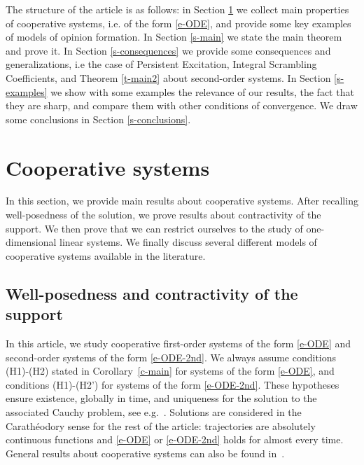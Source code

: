 \documentclass[journal]{article}
\begin{document}
The structure of the article is as follows: in Section \ref{s-cooperative} we collect main properties of cooperative systems, i.e. of the form \eqref{e-ODE}, and provide some key examples of models of opinion formation. In Section \ref{s-main} we state the main theorem and prove it. In Section \ref{s-consequences} we provide some consequences and generalizations, i.e the case of Persistent Excitation, Integral Scrambling Coefficients, and Theorem \ref{t-main2} about second-order systems. In  Section \ref{s-examples} we show with some examples the relevance of our results, the fact that they are sharp, and compare them with other conditions of convergence. We draw some conclusions in Section \ref{s-conclusions}.

\section{Cooperative systems}
\label{s-cooperative}

In this section, we provide main results about cooperative systems. After recalling well-posedness of the solution, we  prove results about contractivity of the support. We then prove that we can restrict ourselves to the study of one-dimensional linear systems. We finally discuss several different models of cooperative systems available in the literature.

\subsection{Well-posedness and contractivity of the support} \label{s-contractive}

In this article, we study cooperative first-order systems of the form \eqref{e-ODE} and second-order systems of the form \eqref{e-ODE-2nd}. We always assume conditions (H1)-(H2) stated in Corollary~\ref{c-main} for systems of the form \eqref{e-ODE},
and conditions (H1)-(H2') for systems of the form \eqref{e-ODE-2nd}. These hypotheses ensure existence, globally in time, and uniqueness for the solution to the associated Cauchy problem, see e.g.~\cite{filippov}. Solutions are considered in the Carathéodory sense for the rest of the article: trajectories are absolutely continuous functions and  \eqref{e-ODE} or  \eqref{e-ODE-2nd} holds for almost every time. 
 General results about cooperative systems can also be found in~\cite{smith}.
 
\end{document}
